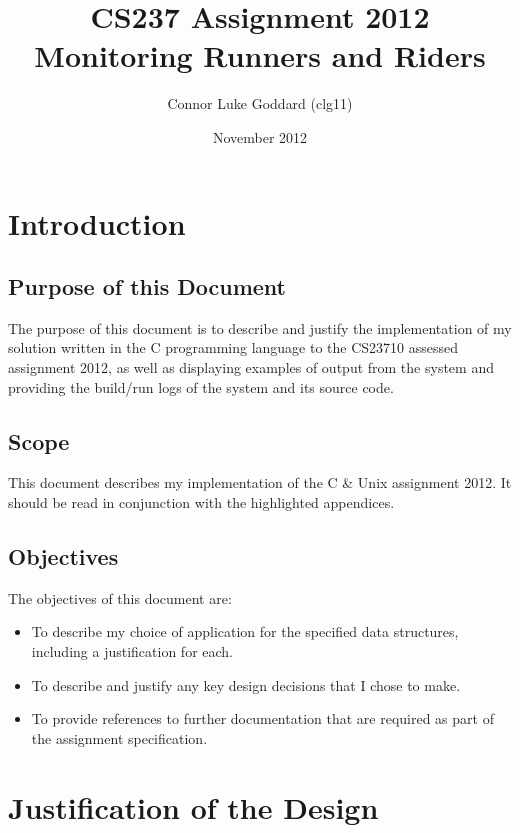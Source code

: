 \documentclass[12pt]{article}
\title{CS237 Assignment 2012 \\
 Monitoring Runners and Riders}
\author{Connor Luke Goddard (clg11)}
\date{November 2012}
\begin{document}
\maketitle
\clearpage

\tableofcontents
\clearpage


\section{Introduction}

\subsection{Purpose of this Document}
The purpose of this document is to describe and justify the implementation of my solution written in the C programming language to the CS23710 assessed assignment 2012, as well as displaying examples of output from the system and providing the build/run logs of the system and its source code.

\subsection{Scope}
This document describes my implementation of the C \& Unix assignment 2012. It should be read in conjunction with the highlighted appendices.

\subsection{Objectives}

The objectives of this document are:

\begin{itemize}

\item To describe my choice of application for the specified data structures, including a justification for each.

\item To describe and justify any key design decisions that I chose to make.

\item To provide references to further documentation that are required as part of the assignment specification.

\end{itemize}

\clearpage 
\section{Justification of the Design}
\end{document}

